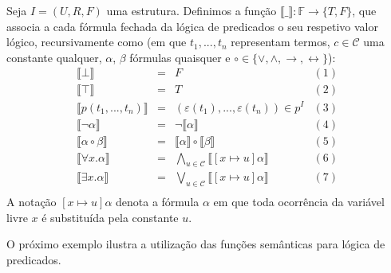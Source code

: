 \begin{Definition}\label{predlogicformulasem}
Seja $I=(U,R,F)$ uma estrutura. Definimos a função $\llbracket\_\rrbracket :
\mathbb{F}\to \{T,F\}$, que associa a cada fórmula fechada da lógica de
predicados o seu respetivo valor lógico, recursivamente como (em que
$t_1,...,t_n$ representam termos, $c\in\mathcal{C}$ uma constante qualquer, $\alpha$,
$\beta$ fórmulas quaisquer e $\circ\in\{\lor,\land,\to,\leftrightarrow\}$):
\[
\begin{array}{lclc}
\llbracket \bot \rrbracket & = & F & (1)\\
\llbracket \top \rrbracket & = & T & (2)\\
\llbracket p(t_1,...,t_n) \rrbracket & = & (\varepsilon(t_1),...,\varepsilon(t_n))
\in p^I & (3)\\
\llbracket \neg \alpha \rrbracket & = & \neg \llbracket \alpha
\rrbracket & (4) \\
\llbracket \alpha \circ \beta \rrbracket & = & \llbracket \alpha
\rrbracket \circ \llbracket \beta \rrbracket & (5)\\
\llbracket \forall x. \alpha \rrbracket & = & \bigwedge\limits_{u\in
  \mathcal{C}}\llbracket [x \mapsto u] \alpha \rrbracket & (6)\\
\llbracket \exists x. \alpha \rrbracket & = & \bigvee\limits_{u\in
  \mathcal{C}}\llbracket [x \mapsto u] \alpha \rrbracket & (7)\\
\end{array}
\]
A notação $[x\mapsto u]\alpha$ denota a fórmula $\alpha$ em que toda
ocorrência da variável livre $x$ é substituída pela constante $u$.
\end{Definition}
O próximo exemplo ilustra a utilização das funções semânticas para
lógica de predicados.
